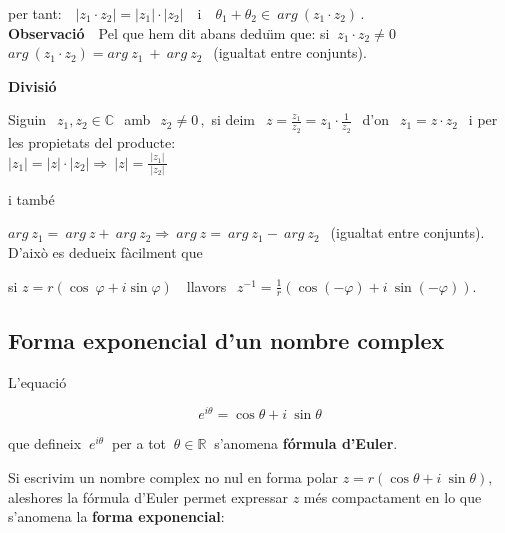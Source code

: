 \documentclass[12pt]{article}
\newcommand{\observacio}{\textbf{Observaci{\'o}}\ \ }
\newcommand{\R}{\mathbb{R}}
\newcommand{\C}{\mathbb{C}}
\begin{document}
per tant: $\ \ \ |z_1\cdot z_2|=|z_1|\cdot|z_2|\ \ \ $      i   $\ \
\
\theta_1+\theta_2\in\ arg\ (z_1\cdot z_2)\,.$\\

\observacio Pel que hem dit abans dedu\"{\i}m que: si $\ z_1\cdot
z_2\neq0$\\

\hspace{1.5cm}$arg\ (z_1\cdot z_2)=arg\ z_1\ +\ arg\ z_2\ \ $
(igualtat entre conjunts).\\

\begin{center}
\textbf{Divisi{\'o}}
\end{center}

Siguin $\ \ z_1,z_2\in \C\ $\  amb\ $\ z_2\neq0\,,$ si deim $\ \
z=\displaystyle\frac{z_1}{z_2}=z_1\cdot\displaystyle\frac{1}{z_2}\ \
$ d'on $\ \ z_1=z\cdot
z_2\ \ $ i per les propietats del producte:\\

\hspace{2.5cm}$|z_1|=|z|\cdot|z_2|\Longrightarrow\
|z|=\displaystyle\frac{\ |z_1|\ }{|z_2|}$\

i tamb{\'e}

\hspace{1.5cm}$arg\ z_1=\ arg\ z+\ arg\ z_2\Longrightarrow\ arg\ z=\
arg\ z_1-\
arg\ z_2\ \ $ (igualtat entre conjunts).\\

\vspace{0.5cm}
D'aix{\`o} es dedueix f{\`a}cilment que

\vspace{0.5cm}
\hspace{1.5cm}si $z=r(\cos\ \varphi+i\sin\varphi)\ \ \ $ llavors $\
\ z^{-1}=\displaystyle\frac{1}{r}\left(\cos(-\varphi)+i\
\sin(-\varphi)\right).$

\newpage

\subsection{Forma exponencial d'un nombre complex}

L'equaci{\'o}

$$
 e^{i\theta}=\cos \theta+ i\ \sin\theta
$$

que defineix $\ e^{i\theta}\ $ per a tot $\ \theta\in \R\ $
s'anomena \textbf{f{\'o}rmula d'Euler}.\

Si escrivim un nombre complex no nul en forma polar
$z=r(\cos\theta+i\ \sin\theta),$ aleshores la f{\'o}rmula d'Euler
permet expressar $z$ m\'{e}s compactament en lo que s'anomena la
\textbf{forma exponencial}:
\end{document}
